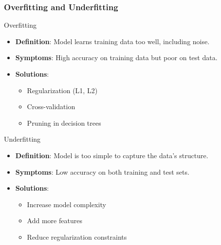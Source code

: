 \documentclass[aspectratio=169]{beamer}
\begin{document}
\begin{frame}[fragile]
    \frametitle{Overfitting and Underfitting}
    \begin{block}{Overfitting}
        \begin{itemize}
            \item \textbf{Definition}: Model learns training data too well, including noise.
            \item \textbf{Symptoms}: High accuracy on training data but poor on test data.
            \item \textbf{Solutions}:
                \begin{itemize}
                    \item Regularization (L1, L2)
                    \item Cross-validation
                    \item Pruning in decision trees
                \end{itemize}
        \end{itemize}
    \end{block}
    
    \begin{block}{Underfitting}
        \begin{itemize}
            \item \textbf{Definition}: Model is too simple to capture the data's structure.
            \item \textbf{Symptoms}: Low accuracy on both training and test sets.
            \item \textbf{Solutions}:
                \begin{itemize}
                    \item Increase model complexity
                    \item Add more features
                    \item Reduce regularization constraints
                \end{itemize}
        \end{itemize}
    \end{block}
\end{frame}
\end{document}

